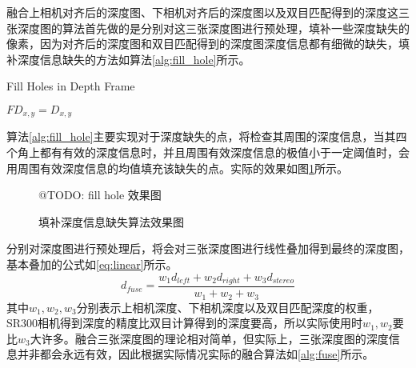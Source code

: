 融合上相机对齐后的深度图、下相机对齐后的深度图以及双目匹配得到的深度这三张深度图的算法首先做的是分别对这三张深度图进行预处理，填补一些深度缺失的像素，因为对齐后的深度图和双目匹配得到的深度图深度信息都有细微的缺失，填补深度信息缺失的方法如算法\ref{alg:fill_hole}所示。
\begin{algorithm}[!ht]
  \caption{Fill Holes in Depth Frame}
  \label{alg:fill_hole}
   {
     {
       {
        $FD_{x,y} = D_{x,y}$\;
      } 
    }
  }
\end{algorithm}
算法\ref{alg:fill_hole}主要实现对于深度缺失的点，将检查其周围的深度信息，当其四个角上都有有效的深度信息时，并且周围有效深度信息的极值小于一定阈值时，会用周围有效深度信息的均值填充该缺失的点。实际的效果如图\ref{fig:fill_hole}所示。
\begin{figure}[!ht]
  \centering
  @TODO: fill hole 效果图
  \caption{填补深度信息缺失算法效果图}
  \label{fig:fill_hole}
\end{figure}
分别对深度图进行预处理后，将会对三张深度图进行线性叠加得到最终的深度图，基本叠加的公式如\ref{eq:linear}所示。
\begin{equation}
  \label{eq:linear}
  d_{fuse} = \frac{w_1d_{left} + w_2d_{right}+w_3d_{stereo}}{w_1+w_2+w_3}
\end{equation}
其中$w_1,w_2,w_3$分别表示上相机深度、下相机深度以及双目匹配深度的权重，SR300相机得到深度的精度比双目计算得到的深度要高，所以实际使用时$w_1,w_2$要比$w_3$大许多。融合三张深度图的理论相对简单，但实际上，三张深度图的深度信息并非都会永远有效，因此根据实际情况实际的融合算法如\ref{alg:fuse}所示。
